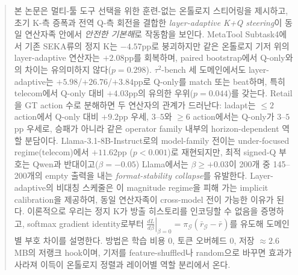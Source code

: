 \begin{abstract}
본 논문은 멀티-툴 도구 선택을 위한 훈련-없는 온톨로지 스티어링을 제시하고, 초기 K-측 증폭과 전역 Q-측 회전을 결합한 \emph{layer-adaptive K+Q steering}이 동일 연산자족 안에서 \emph{안전한 기본해}로 작동함을 보인다. MetaTool Subtask4에서 기존 SEKA류의 정지 K는 $-4.57$pp로 붕괴하지만 같은 온톨로지 기저 위의 layer-adaptive 연산자는 $+2.08$pp를 회복하며, paired bootstrap에서 Q-only와의 차이는 유의미하지 않다($p=0.298$). $\tau^2$-bench 세 도메인에서도 layer-adaptive는 $+5.98$/$+26.76$/$+3.84$pp로 Q-only를 match 또는 beat하며, 특히 telecom에서 Q-only 대비 $+4.03$pp의 유의한 우위($p=0.044$)를 갖는다. Retail을 GT action 수로 분해하면 두 연산자의 관계가 드러난다: ladapt는 $\le 2$ action에서 Q-only 대비 $+9.2$pp 우세, $3$--$5$와 $\ge 6$ action에서는 Q-only가 $3$--$5$pp 우세로, 승패가 아니라 같은 operator family 내부의 horizon-dependent 역할 분담이다. Llama-3.1-8B-Instruct로의 model-family 전이는 under-focused regime(telecom)에서 $+11.62$pp ($p<0.001$)로 재현되지만, 최적 signed-Q 부호는 Qwen과 반대이고($\beta=-0.05$) Llama에서는 $\beta{\ge}{+}0.03$이 200개 중 145--200개의 empty 출력을 내는 \emph{format-stability collapse}를 유발한다. Layer-adaptive의 비대칭 스케줄은 이 magnitude regime을 피해 가는 implicit calibration을 제공하여, 동일 연산자족이 cross-model 전이 가능한 이유가 된다. 이론적으로 우리는 정지 K가 방출 히스토리를 인코딩할 수 없음을 증명하고, softmax gradient identity로부터 $\left.\frac{dL}{d\beta}\right|_{\beta=0} = \pi_{\mathcal G}(\bar r_{\mathcal G}-\bar r)$를 유도해 도메인별 부호 차이를 설명한다. 방법은 학습 비용 0, 토큰 오버헤드 0, 저장 $\approx 2.6$ MB의 저랭크 hook이며, 기저를 feature-shuffled나 random으로 바꾸면 효과가 사라져 이득이 온톨로지 정렬과 레이어별 역할 분리에서 온다.
\end{abstract}
